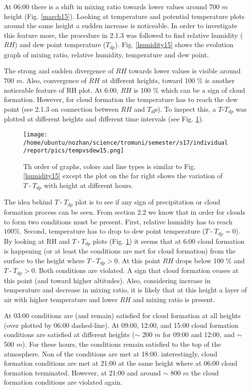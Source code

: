 \documentclass[a4paper,12pt]{article}
\numberwithin{equation}{section} %
\begin{document}
At 06:00 there is a shift in mixing ratio towards lower values around 700 $m$ height (Fig. \ref{march15}). Looking at temperature and potential temperature plots around the same height a sudden increase is noticeable. In order to investigate this feature more, the procedure in 2.1.3 was followed to find relative humidity ($RH$) and dew point temperature ($T_{dp}$). Fig. \ref{humidity15} shows the evolution graph of mixing ratio, relative humidity, temperature and dew point. 

The strong and sudden divergence of $RH$ towards lower values is visible around $700$ $m$. Also, convergence of $RH$ at different heights, toward 100 $\%$ is another noticeable feature of RH plot. At 6:00, $RH$ is 100 $\%$ which can be a sign of cloud formation. However, for cloud formation the temperature has to reach the dew point (see 2.1.3 on connection between $RH$ and $T_dp$). To inspect this, a $T$-$T_{dp}$ was plotted at different heights and different time intervals (see Fig. \ref{tempvsdew15}).

\begin{figure}[bhp]
\texttt{[image: /home/ubuntu/nozhan/science/tromuni/semester/s17/individual/report/pics/tempvsdew15.png]}
\caption{Th order of graphs, colors and line types is similar to Fig. \ref{humidity15} except the plot on the far right shows the variation of $T\:$-$\:T_{dp}$ with height at different hours.}
\label{tempvsdew15}
\end{figure}

The idea behind $T\:$-$\:T_{dp}$ plot is to see if any sign of precipitation or cloud formation process can be seen. From section 2.2 we know that in order for clouds to form two conditions must be present. First, relative humidity has to reach $100 \%$. Second, temperature has to drop to dew point temperature ($T\:$-$\:T_{dp} = 0$). By looking at RH and $T\:$-$\:T_{dp}$ plots (Fig. \ref{tempvsdew15}) it seems that at 6:00 cloud formation is happening (or at least the conditions are met for cloud formation) from the surface to the height where $T\:$-$\:T_{dp} > 0$. At this point $RH$ drops below 100 $\%$ and $T\:$-$\:T_{dp} > 0$. Both conditions are violated. A sign that cloud formation ceases at this point (and toward higher altitudes). Also, considering increase in temperature and decrease in mixing ratio, it is likely that at this height a layer of air with higher temperature and lower $RH$ and mixing ratio is present.

At 03:00 conditions are (and remain) satisfied for cloud formation at all heights (over plotted by 06:00 dashed-line). At 09:00, 12:00, and 15:00 cloud formation conditions are satisfied at different heights ($\sim$ 200 $m$ for 09:00 and 12:00, and $\sim$ 500 $m$). For these hours, the conditions remain satisfied to the top of the atmosphere. Non of the conditions are met at 18:00. interestingly, cloud formation conditions are met at 21:00 at the same height where at 06:00 cloud formation terminated. However, at 21:00 and around $\sim$ 800 $m$ the cloud formation conditions are violated again.
\end{document}
